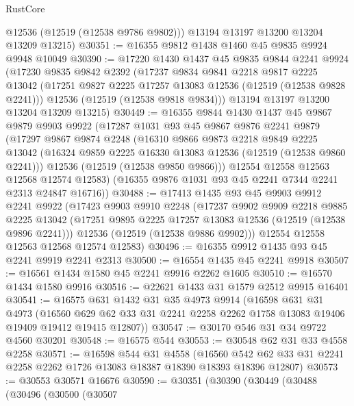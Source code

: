 \begin{lexlean}{RustCore}
\begin{coremodule}
        @12536
        (@12519 (@12538 @9786 @9802)))
      @13194
      @13197
      @13200
      @13204
      @13209
      @13215)
@30351 := @16355 @9812 @1438 @1460 @45 @9835 @9924 @9948 @10049
@30390 := @17220
    @1430
    @1437
    @45
    @9835
    @9844
    @2241
    @9924
    (@17230
      @9835
      @9842
      @2392
      (@17237
        @9834
        @9841
        @2218
        @9817
        @2225
        @13042
        (@17251 @9827 @2225 @17257 @13083 @12536 (@12519 (@12538 @9828 @2241)))
        @12536
        (@12519 (@12538 @9818 @9834)))
      @13194
      @13197
      @13200
      @13204
      @13209
      @13215)
@30449 := @16355
    @9844
    @1430
    @1437
    @45
    @9867
    @9879
    @9903
    @9922
    (@17287
      @1031
      @93
      @45
      @9867
      @9876
      @2241
      @9879
      (@17297
        @9867
        @9874
        @2248
        (@16310
          @9866
          @9873
          @2218
          @9849
          @2225
          @13042
          (@16324 @9859 @2225 @16330 @13083 @12536 (@12519 (@12538 @9860 @2241)))
          @12536
          (@12519 (@12538 @9850 @9866)))
        @12554
        @12558
        @12563
        @12568
        @12574
        @12583)
      (@16355 @9876 @1031 @93 @45 @2241 @7344 @2241 @2313 @24847 @16716))
@30488 := @17413
    @1435
    @93
    @45
    @9903
    @9912
    @2241
    @9922
    (@17423
      @9903
      @9910
      @2248
      (@17237
        @9902
        @9909
        @2218
        @9885
        @2225
        @13042
        (@17251 @9895 @2225 @17257 @13083 @12536 (@12519 (@12538 @9896 @2241)))
        @12536
        (@12519 (@12538 @9886 @9902)))
      @12554
      @12558
      @12563
      @12568
      @12574
      @12583)
@30496 := @16355 @9912 @1435 @93 @45 @2241 @9919 @2241 @2313
@30500 := @16554 @1435 @45 @2241 @9918
@30507 := @16561 @1434 @1580 @45 @2241 @9916 @2262 @1605
@30510 := @16570 @1434 @1580 @9916
@30516 := @22621 @1433 @31 @1579 @2512 @9915 @16401
@30541 := @16575
    @631
    @1432
    @31
    @35
    @4973
    @9914
    (@16598
      @631
      @31
      @4973
      (@16560 @629 @62 @33 @31 @2241 @2258 @2262 @1758 @13083 @19406 @19409 @19412 @19415 @12807))
@30547 := @30170 @546 @31 @34 @9722 @4560 @30201
@30548 := @16575 @544
@30553 := @30548 @62 @31 @33 @4558 @2258
@30571 := @16598
    @544
    @31
    @4558
    (@16560 @542 @62 @33 @31 @2241 @2258 @2262 @1726 @13083 @18387 @18390 @18393 @18396 @12807)
@30573 := @30553 @30571 @16676
@30590 := @30351
    (@30390
      (@30449
        (@30488
          (@30496
            (@30500
              (@30507

\end{coremodule}
\end{lexlean}
